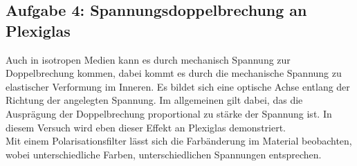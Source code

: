 \documentclass[a4paper,titlepage]{scrartcl}
\numberwithin{equation}{section}
\begin{document}
\subsection{Aufgabe 4: Spannungsdoppelbrechung an Plexiglas}
Auch in isotropen Medien kann es durch mechanisch Spannung zur Doppelbrechung kommen, dabei kommt es durch die mechanische Spannung zu elastischer Verformung  im Inneren. Es bildet sich eine optische Achse entlang der Richtung der angelegten Spannung. Im allgemeinen gilt dabei, das die Ausprägung der Doppelbrechung proportional zu stärke der Spannung ist. In diesem Versuch wird eben dieser Effekt an Plexiglas demonstriert.\\
Mit einem Polarisationsfilter lässt sich die Farbänderung im Material beobachten, wobei unterschiedliche Farben, unterschiedlichen Spannungen entsprechen.
\newpage


\end{document}
